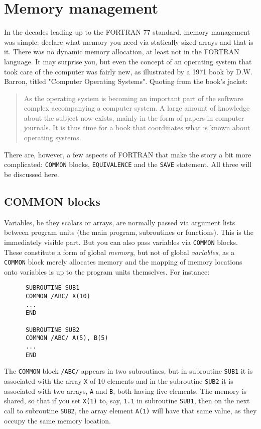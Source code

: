 \section{Memory management}

In the decades leading up to the FORTRAN 77 standard, memory management was simple:
declare what memory you need via statically sized arrays and that is it. There was
no dynamic memory allocation, at least not in the FORTRAN language. It may surprise
you, but even the concept of an operating system that took care of the computer
was fairly new, as illustrated by a 1971 book by D.W. Barron, titled "Computer
Operating Systems". Quoting from the book's jacket:
\begin{quote}
As the operating system is becoming an important part of the software complex
accompanying a computer system. A large amount of knowledge about the subject
now exists, mainly in the form of papers in computer journals. It is thus time for
a book that coordinates what is known about operating systems.
\end{quote}

There are, however, a few aspects of FORTRAN that make the story a bit more
complicated: \verb+COMMON+ blocks, \verb+EQUIVALENCE+ and the \verb+SAVE+ statement.
All three will be discussed here.


\subsection{COMMON blocks}
Variables, be they scalars or arrays, are normally passed via argument lists between
program units (the main program, subroutines or functions). This is the immediately
visible part. But you can also pass variables via \verb+COMMON+ blocks. These
constitute a form of global \emph{memory}, but not of global \emph{variables}, as
a \verb+COMMON+ block merely allocates memory and the mapping of memory
locations onto variables is up to the program units themselves. For instance:
\begin{verbatim}
      SUBROUTINE SUB1
      COMMON /ABC/ X(10)
      ...
      END

      SUBROUTINE SUB2
      COMMON /ABC/ A(5), B(5)
      ...
      END
\end{verbatim}
The \verb+COMMON+ block \verb+/ABC/+ appears in two subroutines, but in subroutine
\verb+SUB1+ it is associated with the array \verb+X+ of 10 elements and in the
subroutine \verb+SUB2+ it is associated with two arrays, \verb+A+ and \verb+B+,
both having five elements. The memory is shared, so that if you set \verb+X(1)+
to, say, \verb+1.1+ in subroutine \verb+SUB1+, then on the next call to subroutine
\verb+SUB2+, the array element \verb+A(1)+ will have that same value, as they occupy
the same memory location.

